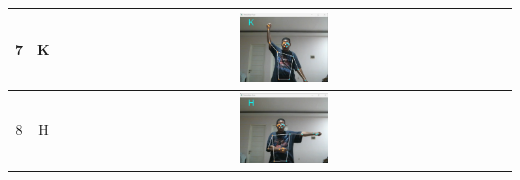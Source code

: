 \begin{table}[h]
\begin{tabular}{|c|c|c|}
			\hline
			7 & K & \includegraphics[width=0.2\textwidth]{gambar/bener/HurufK_ModelCNNXception_Fachry.png} \\
			\hline
			8 & H & \includegraphics[width=0.2\textwidth]{gambar/bener/HurufH_ModelCNNXception_Fachry.png} \\
			\hline
			\end{tabular}
			\end{table}
